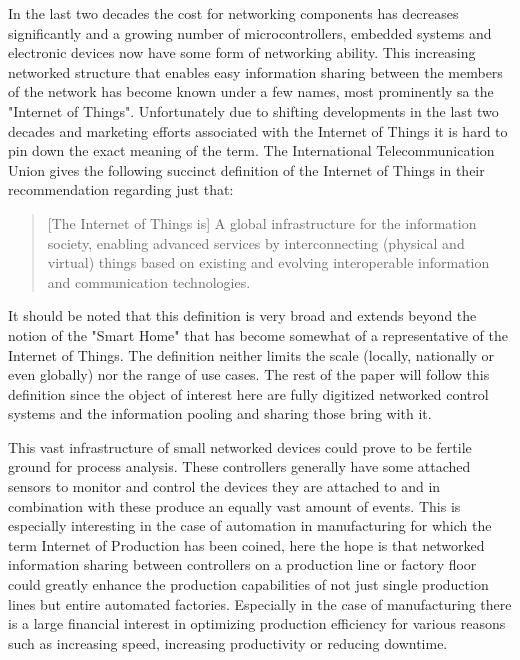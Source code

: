 \documentclass[runningheads]{template/llncs}
\begin{document}
In the last two decades the cost for networking components has decreases significantly and a growing number of microcontrollers, embedded systems and electronic devices now have some form of networking ability.
This increasing networked structure that enables easy information sharing between the members of the network has become known under a few names, most prominently sa the "Internet of Things".
Unfortunately due to shifting developments in the last two decades and marketing efforts associated with the Internet of Things it is hard to pin down the exact meaning of the term. 
The International Telecommunication Union gives the following succinct definition of the Internet of Things in their recommendation \cite{ITUT12} regarding just that:
\blockquote{[The Internet of Things is] A  global  infrastructure  for  the  information  society,  enabling  advanced  services  by  interconnecting  (physical  and  virtual)  things  based  on  existing  and  evolving  interoperable information and communication technologies.}

It should be noted that this definition is very broad and extends beyond the notion of the "Smart Home" that has become somewhat of a representative of the Internet of Things.
The definition neither limits the scale (locally, nationally or even globally) nor the range of use cases.
The rest of the paper will follow this definition since the object of interest here are fully digitized networked control systems and the information pooling and sharing those bring with it.


This vast infrastructure of small networked devices could prove to be fertile ground for process analysis.
These controllers generally have some attached sensors to monitor and control the devices they are attached to and in combination with these produce an equally vast amount of events.
This is especially interesting in the case of automation in manufacturing\cite{JKM*20} for which the term Internet of Production has been coined, here the hope is that networked information sharing between controllers on a production line or factory floor could greatly enhance the production capabilities of not just single production lines but entire automated factories.
Especially in the case of manufacturing there is a large financial interest in optimizing production efficiency for various reasons such as increasing speed, increasing productivity or reducing downtime.
\end{document}
